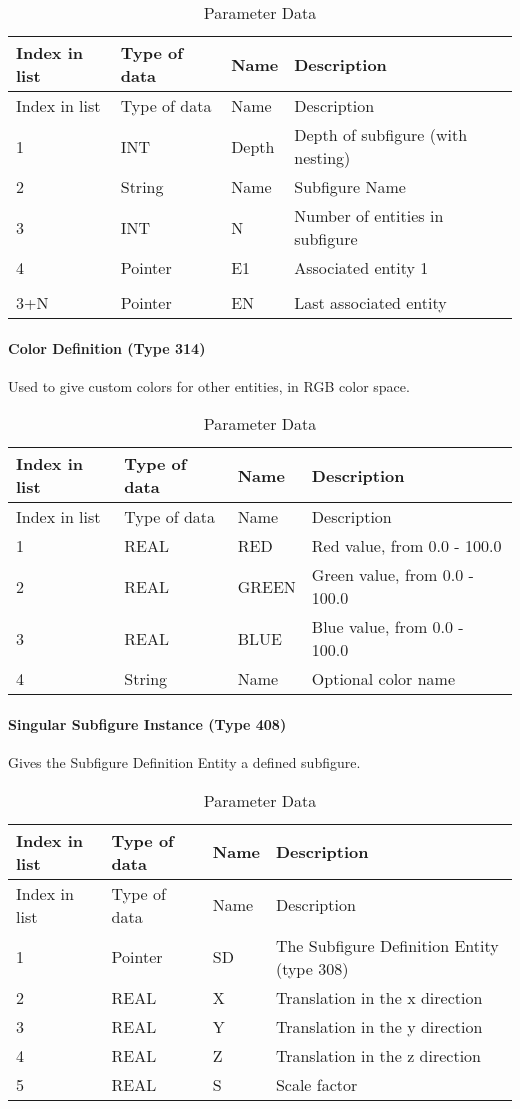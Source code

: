 \begin{longtable}[c]{@{}llll@{}}
\caption{Parameter Data}\tabularnewline
\toprule
Index in list & Type of data & Name & Description\tabularnewline
\midrule
\endfirsthead
\toprule
Index in list & Type of data & Name & Description\tabularnewline
\midrule
\endhead
1 & INT & Depth & Depth of subfigure (with nesting)\tabularnewline
2 & String & Name & Subfigure Name\tabularnewline
3 & INT & N & Number of entities in subfigure\tabularnewline
4 & Pointer & E1 & Associated entity 1\tabularnewline
\vtop{\hbox{\strut .}\hbox{\strut .}} &
\vtop{\hbox{\strut .}\hbox{\strut .}} &
\vtop{\hbox{\strut .}\hbox{\strut .}} &\tabularnewline
3+N & Pointer & EN & Last associated entity\tabularnewline
\bottomrule
\end{longtable}

\paragraph{Color Definition (Type 314)}\label{color-definition-type-314}

Used to give custom colors for other entities, in RGB color space.

\begin{longtable}[c]{@{}llll@{}}
\caption{Parameter Data}\tabularnewline
\toprule
Index in list & Type of data & Name & Description\tabularnewline
\midrule
\endfirsthead
\toprule
Index in list & Type of data & Name & Description\tabularnewline
\midrule
\endhead
1 & REAL & RED & Red value, from 0.0 - 100.0\tabularnewline
2 & REAL & GREEN & Green value, from 0.0 - 100.0\tabularnewline
3 & REAL & BLUE & Blue value, from 0.0 - 100.0\tabularnewline
4 & String & Name & Optional color name\tabularnewline
\bottomrule
\end{longtable}

\paragraph{Singular Subfigure Instance (Type
408)}\label{singular-subfigure-instance-type-408}

Gives the Subfigure Definition Entity a defined subfigure.

\begin{longtable}[c]{@{}llll@{}}
\caption{Parameter Data}\tabularnewline
\toprule
Index in list & Type of data & Name & Description\tabularnewline
\midrule
\endfirsthead
\toprule
Index in list & Type of data & Name & Description\tabularnewline
\midrule
\endhead
1 & Pointer & SD & The Subfigure Definition Entity (type
308)\tabularnewline
2 & REAL & X & Translation in the x direction\tabularnewline
3 & REAL & Y & Translation in the y direction\tabularnewline
4 & REAL & Z & Translation in the z direction\tabularnewline
5 & REAL & S & Scale factor\tabularnewline
\bottomrule
\end{longtable}

